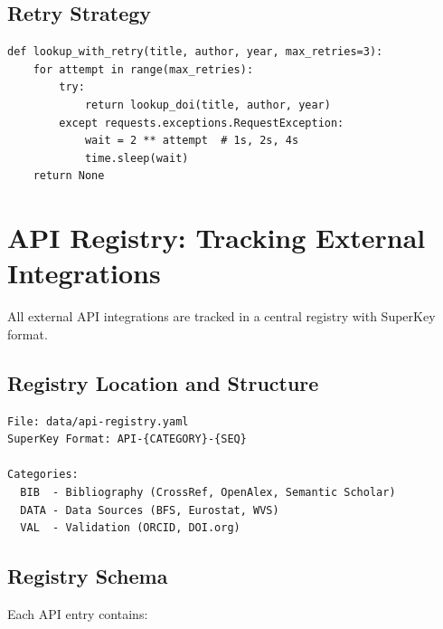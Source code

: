 \subsection{Retry Strategy}

\begin{verbatim}
def lookup_with_retry(title, author, year, max_retries=3):
    for attempt in range(max_retries):
        try:
            return lookup_doi(title, author, year)
        except requests.exceptions.RequestException:
            wait = 2 ** attempt  # 1s, 2s, 4s
            time.sleep(wait)
    return None
\end{verbatim}

\section{API Registry: Tracking External Integrations}
\label{sec:api-registry}

All external API integrations are tracked in a central registry with SuperKey format.

\subsection{Registry Location and Structure}

\begin{verbatim}
File: data/api-registry.yaml
SuperKey Format: API-{CATEGORY}-{SEQ}

Categories:
  BIB  - Bibliography (CrossRef, OpenAlex, Semantic Scholar)
  DATA - Data Sources (BFS, Eurostat, WVS)
  VAL  - Validation (ORCID, DOI.org)
\end{verbatim}

\subsection{Registry Schema}

Each API entry contains:

